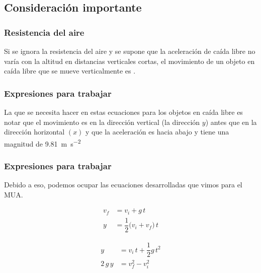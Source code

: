 \documentclass[14pt]{beamer}
\begin{document}
\subsection{Consideración importante}

\begin{frame}
\frametitle{Resistencia del aire}
Si se ignora la resistencia del aire \pause y se supone que la aceleración de caída libre no varía con la altitud en distancias verticales cortas, \pause el movimiento de un objeto en caída libre que se mueve verticalmente es .
\end{frame}
\begin{frame}
\frametitle{Expresiones para trabajar}
La  que se necesita hacer en estas ecuaciones para los objetos en caída libre es notar que el movimiento es en la dirección vertical (la dirección $y$) \pause antes que en la dirección horizontal $(x)$ \pause y que la aceleración es hacia abajo y tiene una magnitud de \SI{9.81}{\meter\per\square\second}
\end{frame}
\begin{frame}
\frametitle{Expresiones para trabajar}
Debido a eso, podemos ocupar las ecuaciones desarrolladas que vimos para el MUA.
\pause
\begin{minipage}{0.4\linewidth}
\begin{align*}
v_{f} &= v_{i} + g \, t \\[0.5em]
y &= \dfrac{1}{2} \big( v_{i} + v_{f} \big) \, t
\end{align*}
\end{minipage}
\hspace{1cm}
\begin{minipage}{0.4\linewidth}
\begin{align*}
y &= v_{i} \, t + \dfrac{1}{2} g \, t^{2} \\[0.5em]
2 \, g \, y &= v_{f}^{2} - v_{i}^{2} 
\end{align*}
\end{minipage}
\end{frame}
\end{document}
